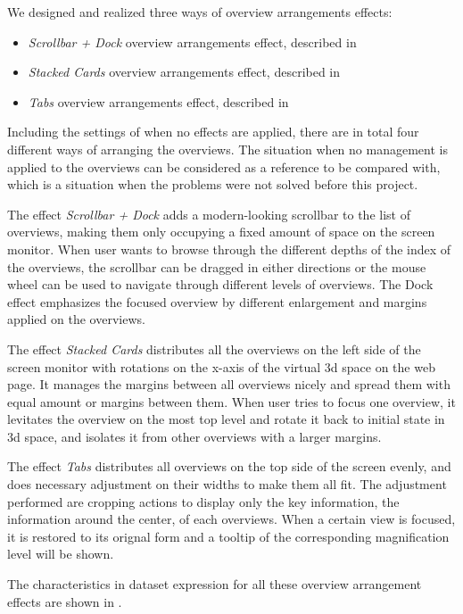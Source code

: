 We designed and realized three ways of overview arrangements effects:

\begin{itemize}
    \item \emph{Scrollbar + Dock} overview arrangements effect, described in 
    \item \emph{Stacked Cards} overview arrangements effect, described in 
    \item \emph{Tabs} overview arrangements effect, described in 
\end{itemize}

Including the settings of when no effects are applied, there are in total four different ways of arranging the overviews. The situation when no management is applied to the overviews can be considered as a reference to be compared with, which is a situation when the problems were not solved before this project.

The effect \emph{Scrollbar + Dock} adds a modern-looking scrollbar to the list of overviews, making them only occupying a fixed amount of space on the screen monitor. When user wants to browse through the different depths of the index of the overviews, the scrollbar can be dragged in either directions or the mouse wheel can be used to navigate through different levels of overviews. The Dock effect emphasizes the focused overview by different enlargement and margins applied on the overviews.

The effect \emph{Stacked Cards} distributes all the overviews on the left side of the screen monitor with rotations on the x-axis of the virtual 3d space on the web page. It manages the margins between all overviews nicely and spread them with equal amount or margins between them. When user tries to focus one overview, it levitates the overview on the most top level and rotate it back to initial state in 3d space, and isolates it from other overviews with a larger margins.

The effect \emph{Tabs} distributes all overviews on the top side of the screen evenly, and does necessary adjustment on their widths to make them all fit. The adjustment performed are cropping actions to display only the key information, the information around the center, of each overviews. When a certain view is focused, it is restored to its orignal form and a tooltip of the corresponding magnification level will be shown.

The characteristics in dataset expression for all these overview arrangement effects are shown in .

